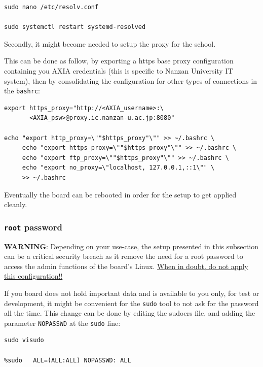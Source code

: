 \documentclass[10pt]{article}
\begin{document}
\begin{verbatim}
sudo nano /etc/resolv.conf

sudo systemctl restart systemd-resolved
\end{verbatim}

Secondly, it might become needed to setup the proxy for the school.

This can be done as follow, by exporting a https base proxy configuration
containing you AXIA credentials (this is specific to Nanzan University IT system),
then by consolidating the configuration for other types of connections in the \texttt{bashrc}:

\begin{verbatim}
export https_proxy="http://<AXIA_username>:\
       <AXIA_psw>@proxy.ic.nanzan-u.ac.jp:8080"

echo "export http_proxy=\""$https_proxy"\"" >> ~/.bashrc \
     echo "export https_proxy=\""$https_proxy"\"" >> ~/.bashrc \
     echo "export ftp_proxy=\""$https_proxy"\"" >> ~/.bashrc \
     echo "export no_proxy=\"localhost, 127.0.0.1,::1\"" \
     >> ~/.bashrc
\end{verbatim}

Eventually the board can be rebooted in order for the setup to get applied cleanly.

\subsubsection{\texttt{root} password}
\label{sec:orgf3c1ee1}
\begin{tcolorbox}[colback=orange!5!white,colframe=orange!75!black]
\textbf{WARNING}: Depending on your use-case, the setup presented in this
subsection can be a critical security breach as it remove the need for a root
password to access the admin functions of the board's Linux.
\uline{When in doubt, do not apply this configuration!!}
\end{tcolorbox}

If you board does not hold important data
and is available to you only, for test or development,
it might be convenient for the \texttt{sudo} tool to not ask for the
password all the time.
This change can be done by editing the sudoers file, and
adding the parameter \texttt{NOPASSWD}
at the \texttt{sudo} line:

\begin{verbatim}
sudo visudo

%sudo   ALL=(ALL:ALL) NOPASSWD: ALL
\end{verbatim}
\end{document}
